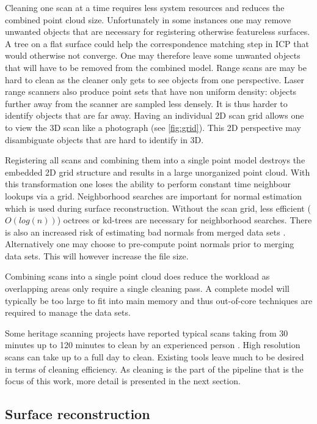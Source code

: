 Cleaning one scan at a time requires less system resources and reduces the combined point cloud size. Unfortunately in some instances one may remove unwanted objects that are necessary for registering otherwise featureless surfaces. A tree on a flat surface could help the correspondence matching step in ICP that would otherwise not converge. One may therefore leave some unwanted objects that will have to be removed from the combined model. Range scans are may be hard to clean as the cleaner only gets to see objects from one perspective. Laser range scanners also produce point sets that have non uniform density: objects further away from the scanner are sampled less densely. It is thus harder to identify objects that are far away. Having an individual 2D scan grid allows one to view the 3D scan like a photograph (see \autoref{fig:grid}). This 2D perspective may disambiguate objects that are hard to identify in 3D. 

Registering all scans and combining them into a single point model destroys the embedded 2D grid structure and results in a large unorganized point cloud. With this transformation one loses the ability to perform constant time neighbour lookups via a grid. Neighborhood searches are important for normal estimation which is used during surface reconstruction. Without the scan grid, less efficient ($O(log(n))$) octrees or kd-trees are necessary for neighborhood searches. There is also an increased risk of estimating bad normals from merged data sets \cite{Ruther2011}. Alternatively one may choose to pre-compute point normals prior to merging data sets. This will however increase the file size.

Combining scans into a single point cloud does reduce the workload as overlapping areas only require a single cleaning pass. A complete model will typically be too large to fit into main memory and thus out-of-core techniques  are required to manage the data sets.

Some heritage scanning projects have reported typical scans taking from 30 minutes up to 120 minutes to clean by an experienced person \cite{Ruther2011}. High resolution scans can take up to a full day to clean. Existing tools leave much to be desired in terms of cleaning efficiency. As cleaning is the part of the pipeline that is the focus of this work, more detail is presented in the next section.


\subsection{Surface reconstruction}  \label{sec:reconstruction}

